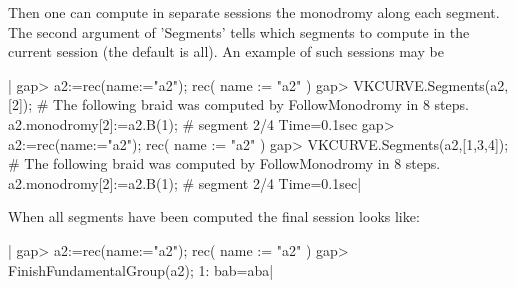 Then  one can  compute in  separate  sessions the  monodromy along  each
segment.  The second  argument  of 'Segments'  tells  which segments  to
compute in the current session (the  default is all). An example of such
sessions may be\:

|    gap> a2:=rec(name:="a2");
    rec(
      name := "a2" )
    gap> VKCURVE.Segments(a2,[2]);
    # The following braid was computed by FollowMonodromy in 8 steps.
    a2.monodromy[2]:=a2.B(1);
    # segment 2/4 Time=0.1sec
    gap> a2:=rec(name:="a2");
    rec(
      name := "a2" )
    gap> VKCURVE.Segments(a2,[1,3,4]);
    # The following braid was computed by FollowMonodromy in 8 steps.
    a2.monodromy[2]:=a2.B(1);
    # segment 2/4 Time=0.1sec|

When all segments have been computed the final session looks like:

|    gap> a2:=rec(name:="a2");
    rec(
      name := "a2" )
    gap> FinishFundamentalGroup(a2);
    1: bab=aba|

